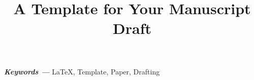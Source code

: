 \documentclass[11pt]{article}
\title{A Template for Your Manuscript Draft} %
\providecommand{\keywords}[1]
{
	\small	
	\textbf{\textit{Keywords --- }} #1
}
\begin{document}
	
	\maketitle
	
	
	
	\keywords{LaTeX, Template, Paper, Drafting}
	
	
	
	

	

	

	
	
	
	\clearpage
	
	\listoffigures
	\listoftables
	\lstlistoflistings
	
\end{document}
